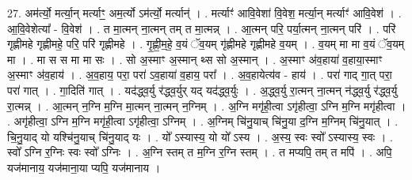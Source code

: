 \documentclass[17pt]{extarticle}
\begin{document}
27. अम॑र्त्यो॒ मर्त्या॒न् मर्त्याꣳ॒॒ अम॒र्त्यो ऽम॑र्त्यो॒ मर्त्यान्॑ । . मर्त्याꣳ॑ आवि॒वेशा॑ वि॒वेश॒ मर्त्या॒न् मर्त्याꣳ॑ आवि॒वेश॑ । . आ॒वि॒वेशेत्या᳚ - वि॒वेश॑ । . त मा॒त्मन् ना॒त्मन् तम् त मा॒त्मन्न् । . आ॒त्मन् परि॒ पर्या॒त्मन् ना॒त्मन् परि॑ । . परि॑ गृह्णीमहे गृह्णीमहे॒ परि॒ परि॑ गृह्णीमहे । . गृ॒ह्णी॒म॒हे॒ व॒यं ॅव॒यम् गृ॑ह्णीमहे गृह्णीमहे व॒यम् । . व॒यम् मा मा व॒यं ॅव॒यम् मा । . मा स स मा मा सः । . सो अ॒स्माꣳ अ॒स्मान् थ्स सो अ॒स्मान् । . अ॒स्माꣳ अ॑व॒हाया॑ व॒हाया॒स्माꣳ अ॒स्माꣳ अ॑व॒हाय॑ । . अ॒व॒हाय॒ परा॒ परा॑ ऽव॒हाया॑ व॒हाय॒ परा᳚ । . अ॒व॒हायेत्य॑व - हाय॑ । . परा॑ गाद् गा॒त् परा॒ परा॑ गात् । . गा॒दिति॑ गात् । . यद॑द्ध्व॒र्यु र॑द्ध्व॒र्युर् यद् यद॑द्ध्व॒र्युः । . अ॒द्ध्व॒र्यु रा॒त्मन् ना॒त्मन् न॑द्ध्व॒र्यु र॑द्ध्व॒र्यु रा॒त्मन्न् । . आ॒त्मन् न॒ग्नि म॒ग्नि मा॒त्मन् ना॒त्मन् न॒ग्निम् । . अ॒ग्नि मगृ॑ही॒त्वा ऽगृ॑हीत्वा॒ ऽग्नि म॒ग्नि मगृ॑हीत्वा । . अगृ॑हीत्वा॒ ऽग्नि म॒ग्नि मगृ॑ही॒त्वा ऽगृ॑हीत्वा॒ ऽग्निम् । . अ॒ग्निम् चि॑नु॒याच् चि॑नु॒या द॒ग्नि म॒ग्निम् चि॑नु॒यात् । . चि॒नु॒याद् यो यश्चि॑नु॒याच् चि॑नु॒याद् यः । . यो᳚ ऽस्यास्य॒ यो यो᳚ ऽस्य । . अ॒स्य॒ स्वः स्वो᳚ ऽस्यास्य॒ स्वः । . स्वो᳚ ऽग्नि र॒ग्निः स्वः स्वो᳚ ऽग्निः । . अ॒ग्नि स्तम् त म॒ग्नि र॒ग्नि स्तम् । . त मप्यपि॒ तम् त मपि॑ । . अपि॒ यज॑मानाय॒ यज॑माना॒या प्यपि॒ यज॑मानाय । \newline
\end{document}
